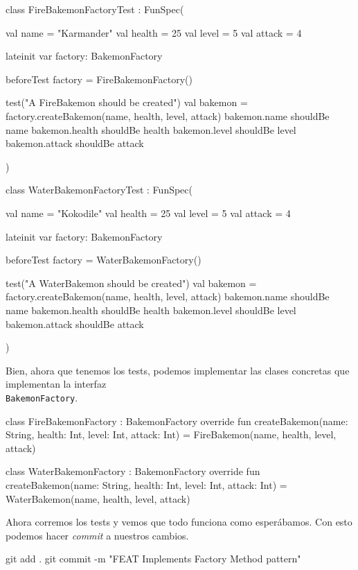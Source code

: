   \begin{kotlin}
    class FireBakemonFactoryTest : FunSpec({
      val name = "Karmander"
      val health = 25
      val level = 5
      val attack = 4
      
      lateinit var factory: BakemonFactory

      beforeTest {
        factory = FireBakemonFactory()
      }

      test("A FireBakemon should be created") {
        val bakemon = factory.createBakemon(name, health, level, attack)
        bakemon.name shouldBe name
        bakemon.health shouldBe health
        bakemon.level shouldBe level
        bakemon.attack shouldBe attack
      }
    })
  \end{kotlin}

  \begin{kotlin}
    class WaterBakemonFactoryTest : FunSpec({
      val name = "Kokodile"
      val health = 25
      val level = 5
      val attack = 4
      
      lateinit var factory: BakemonFactory

      beforeTest {
        factory = WaterBakemonFactory()
      }

      test("A WaterBakemon should be created") {
        val bakemon = factory.createBakemon(name, health, level, attack)
        bakemon.name shouldBe name
        bakemon.health shouldBe health
        bakemon.level shouldBe level
        bakemon.attack shouldBe attack
      }
    })
  \end{kotlin}

  Bien, ahora que tenemos los tests, podemos implementar las clases concretas que implementan la
  interfaz \\\texttt{BakemonFactory}.

  \begin{kotlin}
    class FireBakemonFactory : BakemonFactory {
      override fun createBakemon(name: String, health: Int, level: Int, attack: Int) =
        FireBakemon(name, health, level, attack)
    }
  \end{kotlin}

  \begin{kotlin}
    class WaterBakemonFactory : BakemonFactory {
      override fun createBakemon(name: String, health: Int, level: Int, attack: Int) =
        WaterBakemon(name, health, level, attack)
    }
  \end{kotlin}

  Ahora corremos los tests y vemos que todo funciona como esperábamos.
  Con esto podemos hacer \textit{commit} a nuestros cambios.

  \begin{powershell}
    git add .
    git commit -m "FEAT Implements Factory Method pattern"
  \end{powershell}
